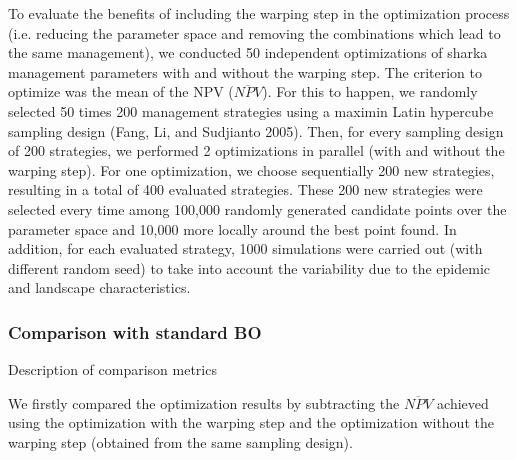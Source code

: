 
To evaluate the benefits of including the warping step in the optimization process (i.e. reducing the parameter space and removing the combinations which lead to the same management), we conducted 50 independent optimizations of sharka management parameters with and without the warping step. The criterion to optimize was the mean of the NPV ($\overline{NPV}$).
For this to happen, we randomly selected 50 times 200 management strategies using a maximin Latin hypercube sampling design (Fang, Li, and Sudjianto 2005). Then, for every sampling design of 200 strategies, we performed 2 optimizations in parallel (with and without the warping step). For one optimization, we choose sequentially 200 new strategies, resulting in a total of 400 evaluated strategies. These 200 new strategies were selected every time among 100,000 randomly generated candidate points over the parameter space and 10,000 more locally around the best point found. In addition, for each evaluated strategy, 1000 simulations were carried out (with different random seed) to take into account the variability due to the epidemic and landscape characteristics.

\subsubsection{Comparison with standard BO}

Description of comparison metrics



We firstly compared the optimization results by subtracting the $\overline{NPV}$ achieved using the optimization with the warping step and the optimization without the warping step (obtained from the same sampling design). 

